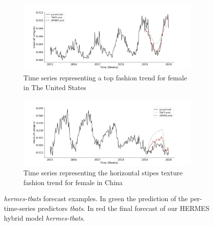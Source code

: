 \documentclass{article} %
\begin{document}
\begin{figure}
\centering
\begin{subfigure}{1.\textwidth}
  \centering
  \includegraphics[width=1.\linewidth]{figure/us_female_top}
  \caption{Time series representing a top fashion trend for female in The United States}
  \label{fig:examples:sub1}
\end{subfigure}
\begin{subfigure}{1.\textwidth}
  \centering
  \includegraphics[width=1.\linewidth]{figure/cn_female_texture_horizontalstripe}
  \caption{Time series representing the horizontal stipes texture fashion trend for female in China}
  \label{fig:examples:sub2}
\end{subfigure}
\caption{\textit{hermes-tbats} forecast examples. In green the prediction of the per-time-series predictors \textit{tbats}. In red the final forecast of our HERMES hybrid model \textit{hermes-tbats}.}
\label{fig:examples}
\end{figure}


%
\end{document}
